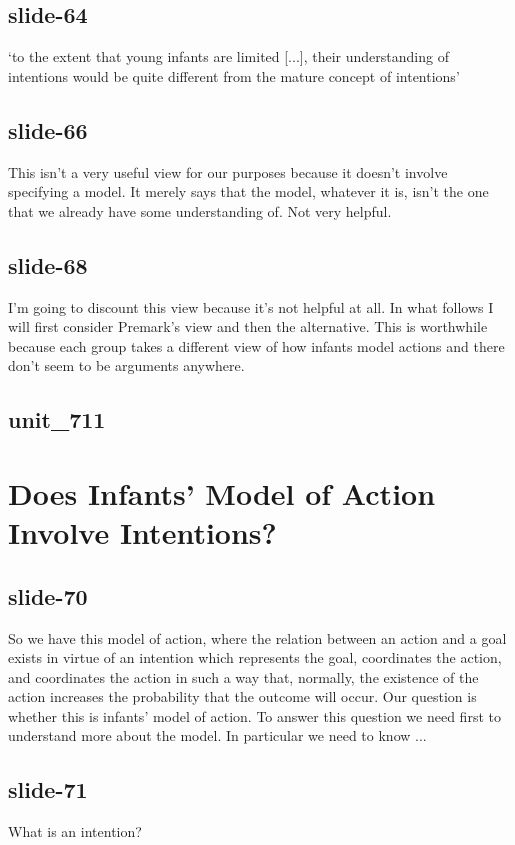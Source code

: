 \documentclass[12pt,\papersize]{extarticle}
\begin{document}
 
\subsection{slide-64}
‘to the extent that young infants are limited [...], their understanding of intentions would be quite different from the mature concept of intentions’
\citep[p.\ 168]{woodward:2001_making}
 
 
\subsection{slide-66}
This isn't a very useful view for our purposes because it doesn't involve specifying a model. It merely says that the model, whatever it is, isn't the one that we already have some understanding of. Not very helpful.
 
 
\subsection{slide-68}
I'm going to discount this view because it's not helpful at all. In what follows I will first consider Premark's view and then the alternative. This is worthwhile because each group takes a different view of how infants model actions and there don't seem to be arguments anywhere.
 
 
\subsection{unit\_711}
 
\section{Does Infants’ Model of Action Involve Intentions?}
 
 
\subsection{slide-70}
So we have this model of action, where the relation between an action and a goal exists in virtue of an intention which represents the goal, coordinates the action, and coordinates the action in such a way that, normally, the existence of the action increases the probability that the outcome will occur.
Our question is whether this is infants' model of action. To answer this question we need first to understand more about the model. In particular we need to know ...
 
 
\subsection{slide-71}
What is an intention?
 
\end{document}
